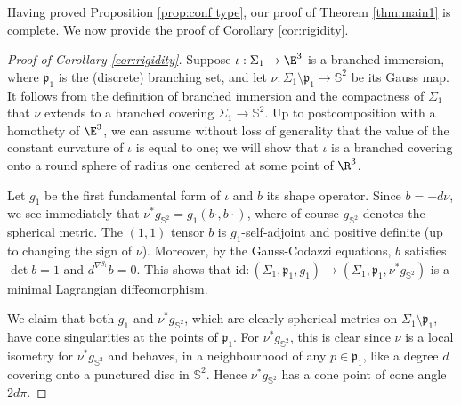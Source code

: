 Having proved Proposition \ref{prop:conf type}, our proof of Theorem \ref{thm:main1} is complete. We now provide the proof of Corollary \ref{cor:rigidity}.

\begin{proof}[Proof of Corollary \ref{cor:rigidity}]
Suppose $\iota:\Sigma_1\to\E^3$ is a branched immersion, where $\mathfrak p_1$ is the (discrete) branching set, and let $\nu:\Sigma_1\setminus\mathfrak p_1\to\mathbb S^2$ be its Gauss map. It follows from the definition of branched immersion and the compactness of $\Sigma_1$ that $\nu$ extends to a branched covering $\Sigma_1\to\mathbb S^2$. Up to {postcomposition with a homothety of $\E^3$}, we can assume without loss of generality that the value of the constant curvature of $\iota$ is equal to one; we will show that $\iota$ is a branched covering onto a round sphere of radius one centered at some point of $\R^3$.

Let $g_1$ be the first fundamental form of $\iota$ and $b$ its shape operator. Since $b=-d\nu$, we see immediately that $\nu^*g_{\mathbb S^2}=g_1(b\cdot,b\cdot)$, where of course $g_{\mathbb S^2}$ denotes the spherical metric. The $(1,1)$ tensor $b$ is $g_1$-self-adjoint and positive definite (up to changing the sign of $\nu$). Moreover, by the Gauss-Codazzi equations, $b$ satisfies $\det b=1$ and $d^{\nabla^{g_1}}\!b=0$. This shows that $\mathrm{id}:(\Sigma_1,\mathfrak p_1,g_1)\to (\Sigma_1,\mathfrak p_1,\nu^*g_{\mathbb S^2})$ is a minimal Lagrangian diffeomorphism.

We claim that both $g_1$ and $\nu^*g_{\mathbb S^2}$, which are clearly spherical metrics on $\Sigma_1\setminus \mathfrak p_1$, have cone singularities at the points of $\mathfrak p_1$. For $\nu^*g_{\mathbb S^2}$, this is clear since $\nu$ is a local isometry for $\nu^*g_{\mathbb S^2}$ and behaves, in a neighbourhood of any $p\in\mathfrak p_1$, like a degree $d$ covering onto a punctured disc in $\mathbb S^2$. Hence $\nu^*g_{\mathbb S^2}$ has a cone point of cone angle $2d\pi$.


\end{proof}
